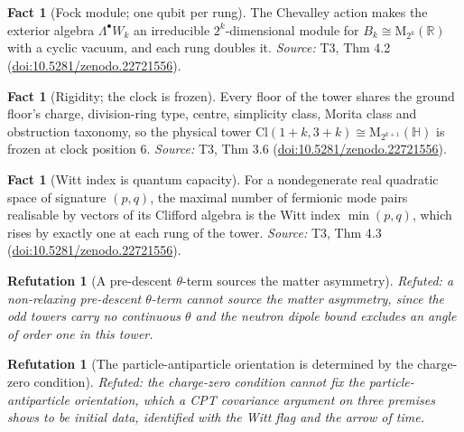 \documentclass[11pt]{article}
\newtheorem{refutation}[theorem]{Refutation}
\theoremstyle{definition}
\newtheorem{fact}[theorem]{Fact}
\theoremstyle{plain}
\providecommand{\Cl}{}\renewcommand{\Cl}{\mathrm{Cl}}
\providecommand{\HH}{}\renewcommand{\HH}{\mathbb{H}}
\providecommand{\Mat}{}\renewcommand{\Mat}{\mathrm{M}}
\providecommand{\R}{}\renewcommand{\R}{\mathbb{R}}
\begin{document}
\begin{fact}[Fock module; one qubit per rung]\label{c:tower.fock-module-one-qubit-per-rung}
The Chevalley action makes the exterior algebra $\Lambda^\bullet W_k$ an irreducible $2^k$-dimensional module for $B_k \cong \Mat_{2^k}(\R)$ with a cyclic vacuum, and each rung doubles it.
\emph{Source:} T3, Thm 4.2 (\href{https://doi.org/10.5281/zenodo.22721556}{doi:10.5281/zenodo.22721556}).
\end{fact}

\begin{fact}[Rigidity; the clock is frozen]\label{c:tower.rigidity-clock-frozen}
Every floor of the tower shares the ground floor's charge, division-ring type, centre, simplicity class, Morita class and obstruction taxonomy, so the physical tower $\Cl(1{+}k, 3{+}k) \cong \Mat_{2^{k+1}}(\HH)$ is frozen at clock position $6$.
\emph{Source:} T3, Thm 3.6 (\href{https://doi.org/10.5281/zenodo.22721556}{doi:10.5281/zenodo.22721556}).
\end{fact}

\begin{fact}[Witt index is quantum capacity]\label{c:tower.witt-index-quantum-capacity}
For a nondegenerate real quadratic space of signature $(p,q)$, the maximal number of fermionic mode pairs realisable by vectors of its Clifford algebra is the Witt index $\min(p,q)$, which rises by exactly one at each rung of the tower.
\emph{Source:} T3, Thm 4.3 (\href{https://doi.org/10.5281/zenodo.22721556}{doi:10.5281/zenodo.22721556}).
\end{fact}

\begin{refutation}[A pre-descent $\theta$-term sources the matter asymmetry]\label{c:refuted.a-pre-descent-term-sources-the-matter-asymmetry}
Refuted: a non-relaxing pre-descent $\theta$-term cannot source the matter asymmetry, since the odd towers carry no continuous $\theta$ and the neutron dipole bound excludes an angle of order one in this tower.
\end{refutation}

\begin{refutation}[The particle-antiparticle orientation is determined by the charge-zero condition]\label{c:refuted.the-particle-antiparticle-orientation-is-determi}
Refuted: the charge-zero condition cannot fix the particle-antiparticle orientation, which a CPT covariance argument on three premises shows to be initial data, identified with the Witt flag and the arrow of time.
\end{refutation}
\end{document}
